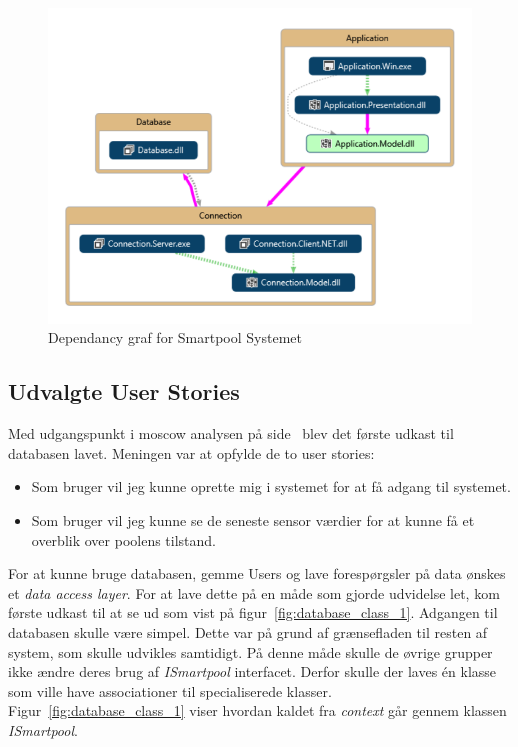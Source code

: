 \begin{figure}[H]
	\centering
	\includegraphics[width=0.8\linewidth]{figs/design/vs_codeMap.PNG}
	\caption{Dependancy graf for Smartpool Systemet}
	\label{fig:vs_codeMap}
\end{figure}

\subsection{Udvalgte User Stories}

Med udgangspunkt i \gls{moscow} analysen på side~\pageref{sec:moscow} blev det første udkast til databasen lavet. Meningen var at opfylde de to user stories: 

\begin{itemize}
	\item Som bruger vil jeg kunne oprette mig i systemet for at få adgang til systemet.
	\item Som bruger vil jeg kunne se de seneste sensor værdier for at kunne få et overblik over poolens tilstand.
\end{itemize}

For at kunne bruge databasen, gemme Users og lave forespørgsler på data ønskes et \textit{data access layer}.
For at lave dette på en måde som gjorde udvidelse let, kom første udkast til at se ud som vist på figur~\ref{fig:database_class_1}. Adgangen til databasen skulle være simpel. Dette var på grund af grænsefladen til resten af system, som skulle udvikles samtidigt. På denne måde skulle de øvrige grupper ikke ændre deres brug af \textit{ISmartpool} interfacet.  Derfor skulle der laves én klasse som ville have associationer til specialiserede klasser. Figur~\ref{fig:database_class_1} viser hvordan kaldet fra \textit{context} går gennem klassen \textit{ISmartpool}.

